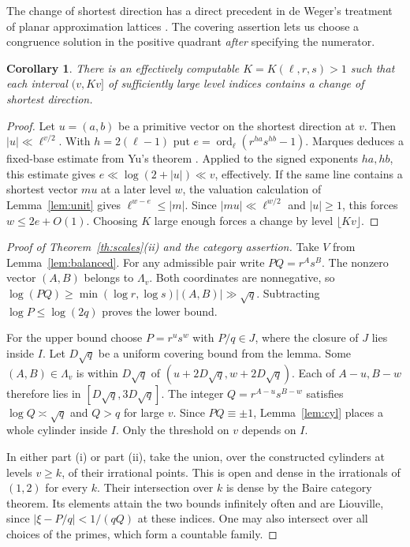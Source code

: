 \documentclass[11pt]{article}
\newtheorem{corollary}[theorem]{Corollary}
\begin{document}
The change of shortest direction has a direct precedent in
de Weger's treatment of planar approximation lattices
\cite[Definition 2.1 and proof of Theorem 4.1(ii)]{dw}.
The covering assertion lets us choose a congruence solution
in the positive quadrant \emph{after} specifying the numerator.

\begin{corollary}\label{cor:frequency}
There is an effectively computable $K=K(\ell,r,s)>1$ such that each
interval $(v,Kv]$ of sufficiently large level indices contains a change
of shortest direction.
\end{corollary}
\begin{proof}
Let $u=(a,b)$ be a primitive vector on the shortest direction at $v$.
Then $|u|\ll\ell^{v/2}$. With $h=2(\ell-1)$ put
$e=\operatorname{ord}_\ell(r^{ha}s^{hb}-1)$.
Marques deduces a fixed-base estimate from Yu's theorem
\cite[\S1.1, p.~190]{yu}. Applied to the signed exponents $ha,hb$,
this estimate \cite[Lemma 2.1]{marques} gives
$e\ll\log(2+|u|)\ll v$, effectively. If the same line contains a shortest
vector $mu$ at a later level $w$, the valuation calculation of
Lemma~\ref{lem:unit} gives $\ell^{w-e}\le |m|$.
Since $|mu|\ll\ell^{w/2}$ and $|u|\ge1$, this forces $w\le 2e+O(1)$.
Choosing $K$ large enough forces a change by level $\lfloor Kv\rfloor$.
\end{proof}

\begin{proof}[Proof of Theorem~\ref{th:scales}(ii) and the category assertion]
Take $V$ from Lemma~\ref{lem:balanced}. For any admissible pair write
$P Q=r^A s^B$. The nonzero vector $(A,B)$ belongs to $\Lambda_v$.
Both coordinates are nonnegative, so
$\log(P Q)\ge\min(\log r,\log s)|(A,B)|\gg\sqrt q$.
Subtracting $\log P\le\log(2q)$ proves the lower bound.

For the upper bound choose $P=r^u s^w$ with $P/q\in J$, where the closure
of $J$ lies inside $I$. Let $D\sqrt q$ be a uniform covering bound from
the lemma. Some $(A,B)\in\Lambda_v$ is within $D\sqrt q$ of
$(u+2D\sqrt q,w+2D\sqrt q)$. Each of $A-u,B-w$ therefore lies in
$[D\sqrt q,3D\sqrt q]$. The integer $Q=r^{A-u}s^{B-w}$ satisfies
$\log Q\asymp\sqrt q$ and $Q>q$ for large $v$. Since $P Q\equiv\pm1$,
Lemma~\ref{lem:cyl} places a whole cylinder inside $I$. Only the
threshold on $v$ depends on $I$.

In either part (i) or part (ii), take the union, over the constructed
cylinders at levels $v\ge k$, of their irrational points. This is open
and dense in the irrationals of $(1,2)$ for every $k$. Their intersection
over $k$ is dense by the Baire category theorem. Its elements attain the
two bounds infinitely often and are Liouville, since
$|\xi-P/q|<1/(qQ)$ at these indices. One may also intersect over all
choices of the primes, which form a countable family.
\end{proof}
\end{document}
